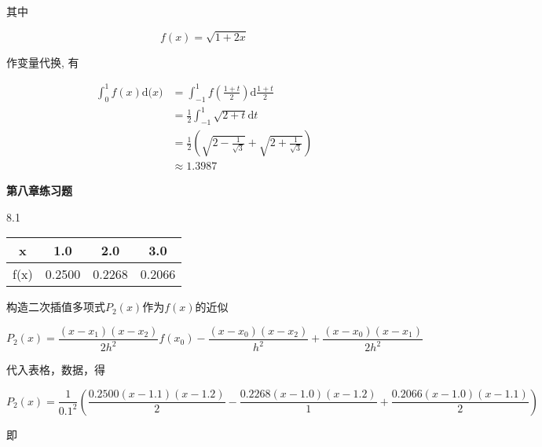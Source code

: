\documentclass[a4paper, 10pt]{article}
\newcommand{\ud}[1]{\mathrm{d} {#1}}
\begin{document}
\begin{CJK}{UTF8}{gbsn}


其中

\begin{equation*}
	f(x) = \sqrt{1+2x}
\end{equation*}

作变量代换, 有

\begin{align*}
	\int_{0}^{1}f(x)\ud(x) & = \int_{-1}^{1}f(\frac{1+t}{2})\ud{\frac{1+t}{2}} \\
						   & = \frac{1}{2}\int_{-1}^{1}\sqrt{2+t}\ud{t} \\
						   & = \frac{1}{2}(\sqrt{2-\frac{1}{\sqrt{3}}} + \sqrt{2+\frac{1}{\sqrt{3}}}) \\
						   & \approx 1.3987
\end{align*}



\textbf{第八章练习题}

8.1\\
\begin{tabular}{|c | c c c|}
\hline
x    & 1.0    & 2.0    & 3.0 \\
\hline
f(x) & 0.2500 & 0.2268 & 0.2066 \\
\hline
\end{tabular}

构造二次插值多项式$P_2(x)$作为$f(x)$的近似

\begin{equation*}
	P_{2}(x) = \frac{(x-x_{1})(x-x_{2})}{2h^2}f(x_0) - \frac{(x-x_0)(x-x_2)}{h^2} + \frac{(x-x_0)(x-x_1)}{2h^2}
\end{equation*}

代入表格，数据，得

\begin{equation*}
	P_2(x) = \frac{1}{0.1^2}(\frac{0.2500(x-1.1)(x-1.2)}{2}-\frac{0.2268(x-1.0)(x-1.2)}{1}+\frac{0.2066(x-1.0)(x-1.1)}{2})
\end{equation*}

即


\end{CJK}
\end{document}
